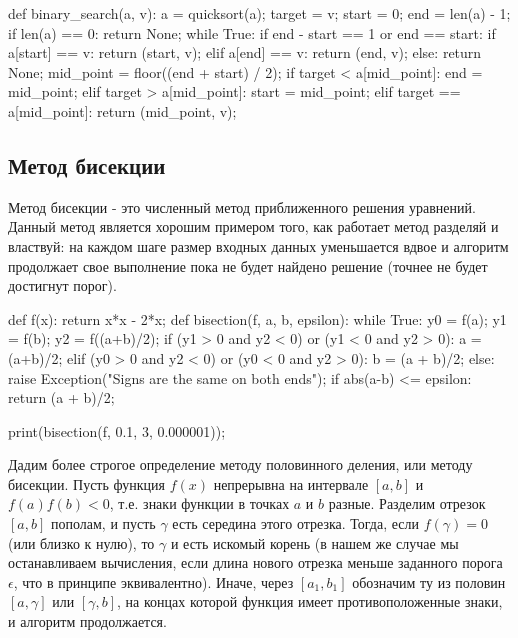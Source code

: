 \begin{python}
def binary_search(a, v):
	a = quicksort(a);
	target = v;
	start = 0;
	end = len(a) - 1;
	if len(a) == 0:
		return None;
	while True:
		if end - start == 1 or end == start:
			if a[start] == v:
				return (start, v);
			elif a[end] == v:
				return (end, v);
			else:
				return None;
		mid_point = floor((end + start) / 2);
		if target < a[mid_point]:
			end = mid_point;
		elif target > a[mid_point]:
			start = mid_point;
		elif target == a[mid_point]:
			return (mid_point, v);
\end{python}



\subsection{Метод бисекции}

Метод бисекции - это численный метод приближенного решения уравнений.
Данный метод является хорошим примером того, как работает метод разделяй и властвуй:
на каждом шаге размер входных данных уменьшается вдвое и алгоритм продолжает 
свое выполнение пока не будет найдено решение (точнее не будет достигнут 
порог). 

\begin{python}
def f(x):
	return x*x - 2*x;
def bisection(f, a, b, epsilon):
	while True:
		y0 = f(a);
		y1 = f(b);
		y2 = f((a+b)/2);
		if (y1 > 0 and y2 < 0) or (y1 < 0 and y2 > 0):
			a = (a+b)/2;
		elif (y0 > 0 and y2 < 0) or (y0 < 0 and y2 > 0):
			b = (a + b)/2;
		else:
			raise Exception("Signs are the same on both ends");
		if abs(a-b) <= epsilon:
			return (a + b)/2;

print(bisection(f, 0.1, 3, 0.000001));
\end{python}

Дадим более строгое определение методу половинного 
деления, или методу бисекции. Пусть функция $f(x)$ непрерывна
на интервале $[a, b]$ и $f(a)f(b)<0$, т.е. знаки функции
в точках $a$ и $b$ разные. Разделим отрезок $[a, b]$ пополам,
и пусть $\gamma$ есть середина этого отрезка. Тогда, если
$f(\gamma) = 0$ (или близко к нулю), то $\gamma$ и есть
искомый корень (в нашем же случае мы останавливаем вычисления,
если длина нового отрезка меньше заданного порога $\epsilon$, что в принципе
эквивалентно). Иначе, через $[a_1, b_1]$ обозначим ту из половин
$[a, \gamma]$ или $[\gamma, b]$, на концах которой функция имеет
противоположенные знаки, и алгоритм продолжается.



